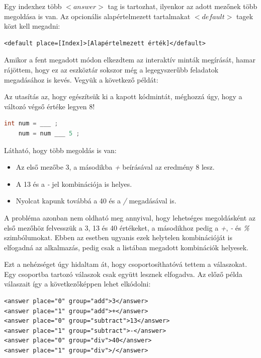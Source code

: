 \documentclass[12pt,a4paper]{article}
\begin{document}
	Egy indexhez több $<answer>$ tag is tartozhat, ilyenkor az adott mezőnek több megoldása is van. Az opcionális alapértelmezett tartalmakat $<default>$ tagek közt kell megadni:
	
	\bigskip %
	\begin{lstlisting}
<default place=[Index]>[Alapértelmezett érték]</default>
	\end{lstlisting}
	\bigskip
	
	Amikor a fent megadott módon elkezdtem az interaktív minták megírását, hamar rájöttem, hogy ez az eszköztár sokszor még a legegyszerűbb feladatok megadásához is kevés. Vegyük a következő példát:
	
	Az utasítás az, hogy egészítsük ki a kapott kódmintát, méghozzá úgy, hogy a változó végső értéke legyen 8!
	
	\bigskip
	\begin{lstlisting}[language=Java]
	int num = ___ ;
	num = num ___ 5 ;
	\end{lstlisting}  
	\bigskip
	
	Látható, hogy több megoldás is van:
	
	\begin{itemize}
		\item Az első mezőbe 3, a másodikba \textit{+} beírásával az eredmény 8 lesz.
		\item A 13 és a \textit{-} jel kombinációja is helyes.
		\item Nyolcat kapunk továbbá a 40 és a \textit{/} megadásával is.
	\end{itemize}
	
	A probléma azonban nem oldható meg annyival, hogy lehetséges megoldásként az első mezőhöz felvesszük a 3, 13 és 40 értékeket, a másodikhoz pedig a \textit{+}, \textit{-} és \textit{\%} szimbólumokat. Ebben az esetben ugyanis ezek helytelen kombinációját is elfogadná az alkalmazás, pedig csak a listában megadott kombinációk helyesek.
	
	Ezt a nehézséget úgy hidaltam át, hogy csoportosíthatóvá tettem a válaszokat. Egy csoportba tartozó válaszok csak együtt lesznek elfogadva. Az előző példa válaszait így a következőképpen lehet elkódolni:
	
	\bigskip
	\begin{lstlisting}
<answer place="0" group="add">3</answer>
<answer place="1" group="add">+</answer>
<answer place="0" group="subtract">13</answer>
<answer place="1" group="subtract">-</answer>
<answer place="0" group="div">40</answer>
<answer place="1" group="div">/</answer>
	\end{lstlisting}
	\bigskip
	
\end{document}

